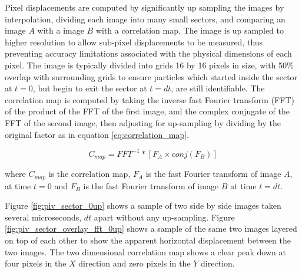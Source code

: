 Pixel displacements are computed by significantly up sampling the images by 
interpolation, dividing each image into many small sectors, and 
comparing an  image $A$ with a image $B$ with a correlation map. The image is 
up sampled to higher resolution to allow sub-pixel displacements to be 
measured, thus preventing accuracy limitations associated with the physical 
dimensions of each pixel. The image is typically divided into grids 16 by 16 
pixels in size, with 50\% overlap with surrounding grids to ensure particles 
which started inside the sector at $t=0$, but begin to exit the sector at 
$t=dt$, are still identifiable.  The correlation map is computed by taking the 
inverse fast Fourier transform (FFT) of the product of the FFT of the first 
image, and the complex conjugate of the FFT of the second image, then adjusting 
for up-sampling by dividing by the original factor as in equation 
\ref{eq:correlation_map}.

\begin{equation}
	C_{map} = FFT^{-1} * [F_A \times conj(F_B) ]
	\label{eq:correlation_map}
\end{equation}

where $C_{map}$ is the correlation map, $F_A$ is the fast Fourier transform of 
image $A$, at time $t=0$ and $F_B$ is the fast Fourier transform of image $B$ 
at time $t=dt$.

Figure \ref{fig:piv_sector_0up} shows a sample of two side by side images taken 
several microseconds, $dt$ apart without any up-sampling. Figure 
\ref{fig:piv_sector_overlay_fft_0up} shows a sample of the same two images 
layered on top of each other to show the apparent horizontal displacement 
between the two images. The two dimensional correlation map shows a clear peak 
down at four pixels in the $X$ direction and zero pixels in the $Y$ direction.


